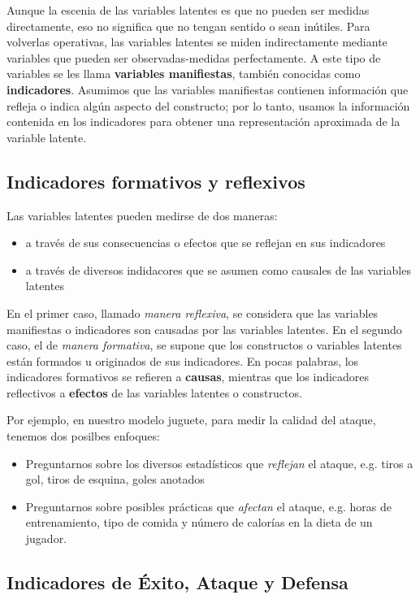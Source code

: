 \documentclass{paper}
\begin{document}
Aunque la escenia de las variables latentes es que no pueden ser medidas directamente, eso no significa que no tengan sentido o sean in\'utiles. Para volverlas operativas, las variables latentes se miden indirectamente mediante variables que pueden ser observadas-medidas perfectamente. A este tipo de variables se les llama {\bf variables manifiestas}, tambi\'en conocidas como {\bf indicadores}. Asumimos que las variables manifiestas contienen informaci\'on que refleja o indica alg\'un aspecto del constructo; por lo tanto, usamos la informaci\'on contenida en los indicadores para obtener una representaci\'on aproximada de la variable latente.

\subsection{Indicadores formativos y reflexivos}

Las variables latentes pueden medirse de dos maneras:
\begin{itemize}
  \item a trav\'es de sus consecuencias o efectos que se reflejan en sus indicadores
  \item a trav\'es de diversos indidacores que se asumen como causales de las variables latentes
\end{itemize}

En el primer caso, llamado {\em manera reflexiva}, se considera que las variables manifiestas o indicadores son causadas por las variables latentes. En el segundo caso, el de {\em manera formativa}, se supone que los constructos o variables latentes est\'an formados u originados de sus indicadores.
En pocas palabras, los indicadores formativos se refieren a {\bf causas}, mientras que los indicadores reflectivos a {\bf efectos} de las variables latentes o constructos.

Por ejemplo, en nuestro modelo juguete, para medir la calidad del ataque, tenemos dos posilbes enfoques:
\begin{itemize}
  \item Preguntarnos sobre los diversos estad\'isticos que {\em reflejan} el ataque, e.g. tiros a gol, tiros de esquina, goles anotados
  \item Preguntarnos sobre posibles pr\'acticas que {\em afectan} el ataque, e.g. horas de entrenamiento, tipo de comida y n\'umero de calor\'ias en la dieta de un jugador.
\end{itemize}

\subsection{Indicadores de \'Exito, Ataque y Defensa}
\end{document}
